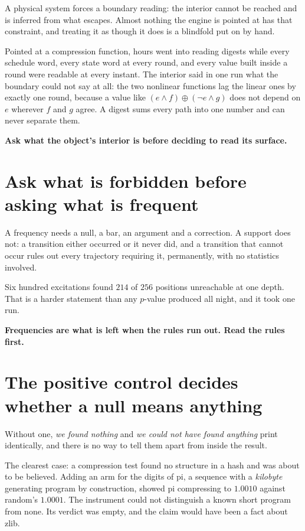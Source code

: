 A physical system forces a boundary reading: the interior cannot be reached and is inferred from what escapes. Almost nothing the engine is pointed at has that constraint, and treating it as though it does is a blindfold put on by hand.

Pointed at a compression function, hours went into reading digests while every schedule word, every state word at every round, and every value built inside a round were readable at every instant. The interior said in one run what the boundary could not say at all: the two nonlinear functions lag the linear ones by exactly one round, because a value like \((e \wedge f) \oplus (\neg e \wedge g)\) does not depend on \(e\) wherever \(f\) and \(g\) agree. A digest sums every path into one number and can never separate them.

\textbf{Ask what the object's interior is before deciding to read its surface.}

\section{Ask what is forbidden before asking what is frequent}

A frequency needs a null, a bar, an argument and a correction. A support does not: a transition either occurred or it never did, and a transition that cannot occur rules out every trajectory requiring it, permanently, with no statistics involved.

Six hundred excitations found \(214\) of \(256\) positions unreachable at one depth. That is a harder statement than any \(p\)-value produced all night, and it took one run.

\textbf{Frequencies are what is left when the rules run out. Read the rules first.}

\section{The positive control decides whether a null means anything}

Without one, \emph{we found nothing} and \emph{we could not have found anything} print identically, and there is no way to tell them apart from inside the result.

The clearest case: a compression test found no structure in a hash and was about to be believed. Adding an arm for the digits of pi, a sequence with a \emph{kilobyte} generating program by construction, showed pi compressing to \(1.0010\) against random's \(1.0001\). The instrument could not distinguish a known short program from none. Its verdict was empty, and the claim would have been a fact about zlib.


